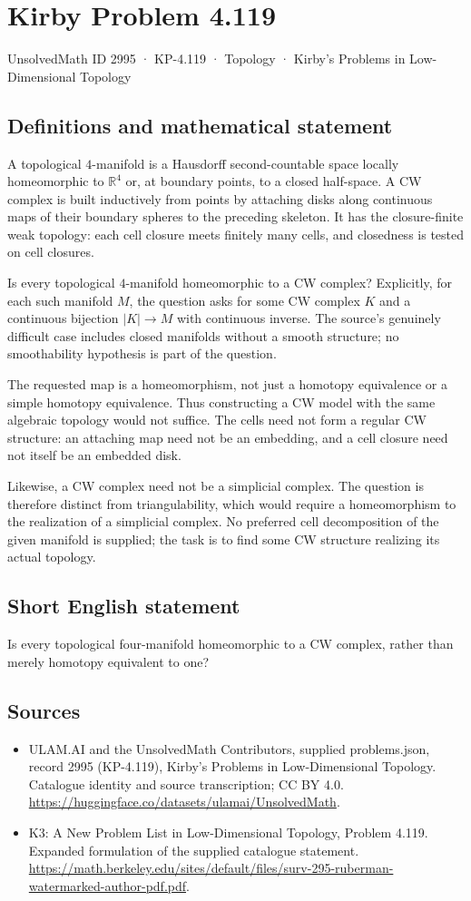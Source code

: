 \documentclass[11pt,a4paper]{article}
\begin{document}
\section*{Kirby Problem 4.119}\label{2995}
{\small UnsolvedMath ID 2995 · KP-4.119 · Topology · Kirby's Problems in Low-Dimensional Topology}
\subsection{Definitions and mathematical statement}
A topological $4$-manifold is a Hausdorff second-countable space
locally homeomorphic to $\mathbb R^4$ or, at boundary points,
to a closed half-space. A CW complex is built inductively from
points by attaching disks along continuous maps of their boundary
spheres to the preceding skeleton. It has the closure-finite weak
topology: each cell closure meets finitely many cells, and closedness
is tested on cell closures.

Is every topological $4$-manifold homeomorphic to a CW complex?
Explicitly, for each such manifold $M$, the question asks for some
CW complex $K$ and a continuous bijection $|K|\to M$ with
continuous inverse. The source's genuinely difficult case includes
closed manifolds without a smooth structure; no smoothability
hypothesis is part of the question.

The requested map is a homeomorphism, not just a homotopy
 equivalence or a simple homotopy equivalence. Thus constructing
a CW model with the same algebraic topology would not suffice.
The cells need not form a regular CW structure: an attaching
map need not be an embedding, and a cell closure need not itself
be an embedded disk.

Likewise, a CW complex need not be a simplicial complex. The
question is therefore distinct from triangulability, which would
require a homeomorphism to the realization of a simplicial complex.
No preferred cell decomposition of the given manifold is supplied;
the task is to find some CW structure realizing its actual topology.
\subsection{Short English statement}
Is every topological four-manifold homeomorphic to a CW complex, rather than merely homotopy equivalent to one?
\subsection{Sources}
\begin{itemize}
\item[S1] ULAM.AI and the UnsolvedMath Contributors, supplied problems.json, record 2995 (KP-4.119), Kirby's Problems in Low-Dimensional Topology. Catalogue identity and source transcription; CC BY 4.0.
\url{https://huggingface.co/datasets/ulamai/UnsolvedMath}.
\item[S2] K3: A New Problem List in Low-Dimensional Topology, Problem 4.119. Expanded formulation of the supplied catalogue statement.
\url{https://math.berkeley.edu/sites/default/files/surv-295-ruberman-watermarked-author-pdf.pdf}.
\end{itemize}
\end{document}
